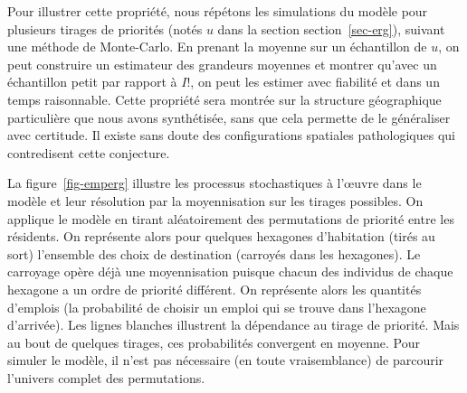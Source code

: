 \documentclass[
  10pt,
  a4paper,
  numbers=noendperiod,
  DIV=9]{scrartcl}
\begin{document}
Pour illustrer cette propriété, nous répétons les simulations du modèle
pour plusieurs tirages de priorités (notés \(u\) dans la section
section~\ref{sec-erg}), suivant une méthode de Monte-Carlo. En prenant
la moyenne sur un échantillon de \(u\), on peut construire un estimateur
des grandeurs moyennes et montrer qu'avec un échantillon petit par
rapport à \(I!\), on peut les estimer avec fiabilité et dans un temps
raisonnable. Cette propriété sera montrée sur la structure géographique
particulière que nous avons synthétisée, sans que cela permette de le
généraliser avec certitude. Il existe sans doute des configurations
spatiales pathologiques qui contredisent cette conjecture.

La figure~\ref{fig-emperg} illustre les processus stochastiques à
l'œuvre dans le modèle et leur résolution par la moyennisation sur les
tirages possibles. On applique le modèle en tirant aléatoirement des
permutations de priorité entre les résidents. On représente alors pour
quelques hexagones d'habitation (tirés au sort) l'ensemble des choix de
destination (carroyés dans les hexagones). Le carroyage opère déjà une
moyennisation puisque chacun des individus de chaque hexagone a un ordre
de priorité différent. On représente alors les quantités d'emplois (la
probabilité de choisir un emploi qui se trouve dans l'hexagone
d'arrivée). Les lignes blanches illustrent la dépendance au tirage de
priorité. Mais au bout de quelques tirages, ces probabilités convergent
en moyenne. Pour simuler le modèle, il n'est pas nécessaire (en toute
vraisemblance) de parcourir l'univers complet des permutations.
\end{document}
